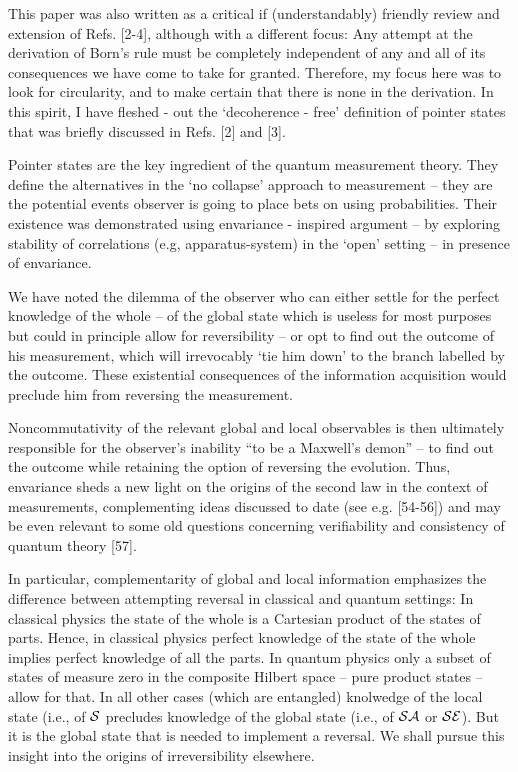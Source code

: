 \documentclass[aps,twocolumn,pra,epsfig]{revtex4}
\begin{document}
This paper was also written as a critical if (understandably) friendly review 
and extension of Refs. [2-4], although with a different focus: Any attempt
at the derivation of Born's rule must be completely independent of any and 
all of its consequences we have come to take for granted. Therefore, 
my focus here was to look for circularity, and to make certain that there is none
in the derivation. In this spirit, I have fleshed - out the `decoherence - free' 
definition of pointer states that was briefly discussed in Refs. [2] and [3]. 

Pointer states are the key ingredient of the quantum measurement theory. 
They define the alternatives in the `no collapse' approach to measurement
-- they are the potential events observer is going to place bets on using 
probabilities. Their existence was demonstrated using envariance - inspired 
argument -- by exploring stability of correlations (e.g, apparatus-system) in 
the `open' setting -- in presence of envariance.

We have noted the dilemma of the observer who can either settle
for the perfect knowledge of the whole -- of the global state which is useless
for most purposes but could in principle allow for reversibility -- or opt to
find out the outcome of his measurement, which will irrevocably `tie him down'
to the branch labelled by the outcome. These existential consequences of the
information acquisition would preclude him from reversing the measurement.

Noncommutativity of the relevant global and local observables is then ultimately
responsible for the observer's inability ``to be a Maxwell's demon'' -- to find
out the outcome while retaining the option of reversing the evolution.
Thus, envariance sheds a new light on the origins of the second law in the
context of measurements, complementing ideas discussed to date (see e.g.
[54-56]) and may be even relevant to some old questions concerning
verifiability and consistency of quantum theory [57]. 

In particular, complementarity of global and local information emphasizes 
the difference between attempting reversal
in classical and quantum settings: In classical physics the state of the whole
is a Cartesian product of the states of parts. Hence, in classical physics
perfect knowledge of the state of the whole implies perfect knowledge of all
the parts. In quantum physics only a subset of states of measure zero in the
composite Hilbert space -- pure product states -- allow for that. In all other
cases (which are entangled) knolwedge of the local state (i.e., of ${\cal S}$
precludes knowledge of the global state (i.e., of ${\cal SA}$ or ${\cal SE}$).
But it is the global state that is needed to implement a reversal. We shall
pursue this insight into the origins of irreversibility elsewhere.
\end{document}
